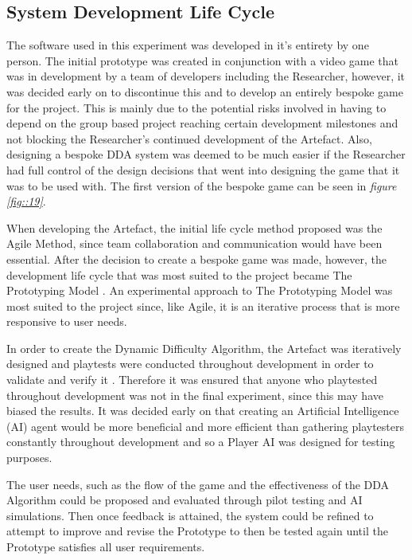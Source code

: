 \documentclass[journal]{IEEEtran}
\begin{document}
\subsection{System Development Life Cycle}

The software used in this experiment was developed in it's entirety by one person. The initial prototype was created in conjunction with a video game that was in development by a team of developers including the Researcher, however, it was decided early on to discontinue this and to develop an entirely bespoke game for the project. This is mainly due to the potential risks involved in having to depend on the group based project reaching certain development milestones and not blocking the Researcher's continued development of the Artefact. Also, designing a bespoke DDA system was deemed to be much easier if the Researcher had full control of the design decisions that went into designing the game that it was to be used with. The first version of the bespoke game can be seen in \textit{figure \ref{fig::19}}.

When developing the Artefact, the initial life cycle method proposed was the Agile Method, since team collaboration and communication would have been essential. After the decision to create a bespoke game was made, however, the development life cycle that was most suited to the project became The Prototyping Model \cite{isaias2015information}. An experimental approach to The Prototyping Model was most suited to the project since, like Agile, it is an iterative process that is more responsive to user needs. 

In order to create the Dynamic Difficulty Algorithm, the Artefact was iteratively designed and playtests were conducted throughout development in order to validate and verify it \cite{fullerton2004game}. Therefore it was ensured that anyone who playtested throughout development was not in the final experiment, since this may have biased the results. It was decided early on that creating an Artificial Intelligence (AI) agent would be more beneficial and more efficient than gathering playtesters constantly throughout development and so a Player AI was designed for testing purposes.

The user needs, such as the flow of the game and the effectiveness of the DDA Algorithm could be proposed and evaluated through pilot testing and AI simulations. Then once feedback is attained, the system could be refined to attempt to improve and revise the Prototype to then be tested again until the Prototype satisfies all user requirements.
\end{document}
